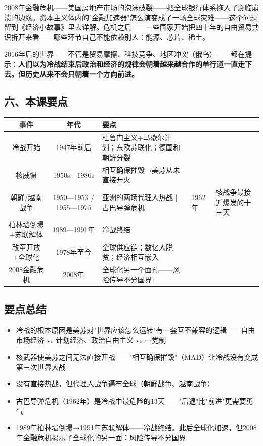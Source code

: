 \documentclass[a4paper,12pt]{ctexart}
\begin{document}
2008年金融危机——美国房地产市场的泡沫破裂——把全球银行体系拖入了濒临崩溃的边缘。资本主义体内的"金融加速器"怎么演变成了一场全球灾难——这个问题留到《经济小故事》里去详解。危机之后——一些国家开始把四十年的自由贸易共识拆开来看——哪些环节自己不能依赖别人：能源、芯片、稀土。

2016年后的世界——不管是贸易摩擦、科技竞争、地区冲突（俄乌）——都在提示：\textbf{人们以为冷战结束后政治和经济的规律会朝着越来越合作的单行道一直走下去。但历史从来不会只朝着一个方向前进。}

\subsection*{六、本课要点}

\begin{center}
\begin{tabular}{|c|c|p{7cm}|}
\hline
\textbf{事件} & \textbf{年代} & \textbf{要点} \\
\hline
冷战开始 & 1947年前后 & 杜鲁门主义+马歇尔计划；东欧苏联化；德国和朝鲜分裂 \\
\hline
核威慑 & 1950s—1980s & 相互确保摧毁→美苏从未直接开火 \\
\hline
朝鲜/越南战争 & 1950—1953 / 1955—1975 & 亚洲的两场代理人热战 |
\hline
古巴导弹危机 & 1962年 & 核战争最接近爆发的十三天 \\
\hline
柏林墙倒塌+苏联解体 & 1989—1991年 & 冷战终结 \\
\hline
改革开放+全球化 & 1978年至今 & 全球供应链；数亿人脱贫；经济相互嵌入 \\
\hline
2008金融危机 & 2008年 & 全球化另一个面孔——风险传导不分国界 \\
\hline
\end{tabular}
\end{center}

\subsection*{要点总结}
\begin{itemize}
  \item 冷战的根本原因是美苏对"世界应该怎么运转"有一套互不兼容的逻辑——自由市场经济 vs 计划经济、政治自由主义 vs 一党制
  \item 核武器使美苏之间无法直接开战——"相互确保摧毁"（MAD）让冷战没有变成第三次世界大战
  \item 没有直接热战，但代理人战争遍布全球（朝鲜战争、越南战争）
  \item 古巴导弹危机（1962年）是冷战中最危险的13天——"后退"比"前进"更需要勇气
  \item 1989年柏林墙倒塌→1991年苏联解体——冷战终结。此后全球化加速，但2008年金融危机揭示了全球化的另一面：风险传导不分国界
\end{itemize}
\end{document}
